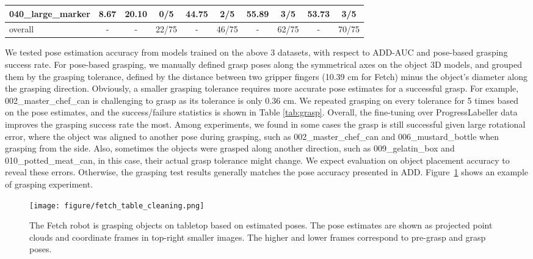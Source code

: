\begin{table*}
\begin{tabular}{@{}lccccccccc@{}}
    \midrule
    040\_large\_marker          & 8.67 & 20.10 & 0/5 & 44.75 & 2/5  & 55.89 & 3/5 & 53.73 & 3/5\\
    \midrule
    overall                     & -    & -     & 22/75 & -   & 46/75 & - & 62/75 & - & 70/75\\
    \bottomrule
  \end{tabular}
  \caption{Grasp record comparison on part of YCB objects using grasp poses generated based on pose estimates from pretrained and fine-tuned FFB6D on the collected dataset, with Blenderproc data synthesis, LabelFusion annotations and ProgressLabeller annotations.}
  \label{tab:grasp}
\end{table*}

We tested pose estimation accuracy from models trained on the above 3 datasets, with respect to ADD-AUC and pose-based grasping success rate. For pose-based grasping, we manually defined grasp poses along the symmetrical axes on the object 3D models, and grouped them by the grasping tolerance, defined by the distance between two gripper fingers (10.39 cm for Fetch) minus the object's diameter along the grasping direction. Obviously, a smaller grasping tolerance requires more accurate pose estimates for a successful grasp. For example, 002\_master\_chef\_can is challenging to grasp as its tolerance is only 0.36 cm.
We repeated grasping on every tolerance for 5 times based on the pose estimates, and the success/failure statistics is shown in Table \ref{tab:grasp}. Overall, the fine-tuning over ProgressLabeller data improves the grasping success rate the most. Among experiments, we found in some cases the grasp is still successful given large rotational error, where the object was aligned to another pose during grasping, such as 002\_master\_chef\_can and 006\_mustard\_bottle when grasping from the side. Also, sometimes the objects were grasped along another direction, such as 009\_gelatin\_box and 010\_potted\_meat\_can, in this case, their actual grasp tolerance might change. We expect evaluation on object placement accuracy to reveal these errors. Otherwise, the grasping test results generally matches the pose accuracy presented in ADD. Figure~\ref{fig:grasping} shows an example of grasping experiment.

 \begin{figure}[htbp]
     \centering
     \texttt{[image: figure/fetch\_table\_cleaning.png]}
     \caption{The Fetch robot is grasping objects on tabletop based on estimated poses. The pose estimates are shown as projected point clouds and coordinate frames in top-right smaller images. The higher and lower frames correspond to pre-grasp and grasp poses.}
     \label{fig:grasping}
 \end{figure}

